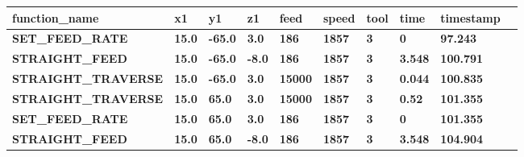 \documentclass[aspectratio=169]{beamer}
\begin{document}
{\begin{frame}[fragile]
\begin{tabular}{|l|l|l|l|l|l|l|l|l|l|}
      \hline

      \tiny{\bfseries{function\_name}} & 
      \tiny{\bfseries{x1}} & 
      \tiny{\bfseries{y1}} & 
      \tiny{\bfseries{z1}} & 
      \tiny{\bfseries{feed}} & 
      \tiny{\bfseries{speed}} & 
      \tiny{\bfseries{tool}} & 
      \tiny{\bfseries{time}} & 
      \tiny{\bfseries{timestamp}} \\
      \hline
    

      \tiny{\bfseries{SET\_FEED\_RATE}} & 
      \tiny{\bfseries{15.0}} & 
      \tiny{\bfseries{-65.0}} & 
      \tiny{\bfseries{3.0}} & 
      \tiny{\bfseries{186}} & 
      \tiny{\bfseries{1857}} & 
      \tiny{\bfseries{3}} & 
      \tiny{\bfseries{0}} & 
      \tiny{\bfseries{97.243}} \\
      \hline

      \tiny{\bfseries{STRAIGHT\_FEED}} & 
      \tiny{\bfseries{15.0}} & 
      \tiny{\bfseries{-65.0}} & 
      \tiny{\bfseries{-8.0}} & 
      \tiny{\bfseries{186}} & 
      \tiny{\bfseries{1857}} & 
      \tiny{\bfseries{3}} & 
      \tiny{\bfseries{3.548}} & 
      \tiny{\bfseries{100.791}} \\
      \hline

      \tiny{\bfseries{STRAIGHT\_TRAVERSE}} & 
      \tiny{\bfseries{15.0}} & 
      \tiny{\bfseries{-65.0}} & 
      \tiny{\bfseries{3.0}} & 
      \tiny{\bfseries{15000}} & 
      \tiny{\bfseries{1857}} & 
      \tiny{\bfseries{3}} & 
      \tiny{\bfseries{0.044}} & 
      \tiny{\bfseries{100.835}} \\
      \hline

      \tiny{\bfseries{STRAIGHT\_TRAVERSE}} & 
      \tiny{\bfseries{15.0}} & 
      \tiny{\bfseries{65.0}} & 
      \tiny{\bfseries{3.0}} & 
      \tiny{\bfseries{15000}} & 
      \tiny{\bfseries{1857}} & 
      \tiny{\bfseries{3}} & 
      \tiny{\bfseries{0.52}} & 
      \tiny{\bfseries{101.355}} \\
      \hline    

      \tiny{\bfseries{SET\_FEED\_RATE}} & 
      \tiny{\bfseries{15.0}} & 
      \tiny{\bfseries{65.0}} & 
      \tiny{\bfseries{3.0}} & 
      \tiny{\bfseries{186}} & 
      \tiny{\bfseries{1857}} & 
      \tiny{\bfseries{3}} & 
      \tiny{\bfseries{0}} & 
      \tiny{\bfseries{101.355}} \\
      \hline

      \tiny{\bfseries{STRAIGHT\_FEED}} & 
      \tiny{\bfseries{15.0}} & 
      \tiny{\bfseries{65.0}} & 
      \tiny{\bfseries{-8.0}} & 
      \tiny{\bfseries{186}} & 
      \tiny{\bfseries{1857}} & 
      \tiny{\bfseries{3}} & 
      \tiny{\bfseries{3.548}} & 
      \tiny{\bfseries{104.904}} \\
      \hline


\end{tabular}
\end{frame}}
\end{document}
